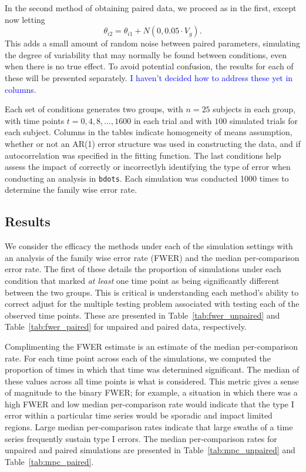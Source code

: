 \documentclass{article}
\newcommand{\xt}{\texttt}
\providecommand{\cn}[1]{\textcolor{blue}{#1}}
\begin{document}
In the second method of obtaining paired data, we proceed as in the first, except now letting
\begin{equation}
\theta_{i2} = \theta_{i1} + N(0, 0.05 \cdot  V_g).
\end{equation}
This adds a small amount of random noise between paired parameters, simulating the degree of variability that may normally be found between conditions, even when there is no true effect.  To avoid potential confusion, the results for each of these will be presented separately. \cn{I haven't decided how to address these yet in columns}.






Each set of conditions generates two groups, with $n = 25$ subjects in each group, with time points $t = 0, 4, 8, \dots, 1600$ in each trial and with $100$ simulated trials for each subject. Columns in the tables indicate homogeneity of means assumption, whether or not an AR(1) error structure was used in constructing the data, and if autocorrelation was specified in the fitting function. The last conditions help assess the impact of correctly or incorrectlyh identifying the type of error when conducting an analysis in \xt{bdots}. Each simulation was conducted 1000 times to determine the family wise error rate. 


\subsection{Results}

We consider the efficacy the methods under each of the simulation settings with an analysis of the family wise error rate (FWER) and the median per-comparison error rate. The first of these details the proportion of simulations under each condition that marked \textit{at least} one time point as being significantly different between the two groups. This is critical is understanding each method's ability to correct adjust for the multiple testing problem associated with testing each of the observed time points. These are presented in Table~\ref{tab:fwer_unpaired} and Table~\ref{tab:fwer_paired} for unpaired and paired data, respectively.

Complimenting the FWER estimate is an estimate of the median per-comparison rate. For each time point across each of the simulations, we computed the proportion of times in which that time was determined significant. The median of these values across all time points is what is considered. This metric gives a sense of magnitude to the binary FWER; for example, a situation in which there was a high FWER and low median per-comparison rate would indicate that the type I error within a particular time series would be sporadic and impact limited regions. Large median per-comparison rates indicate that large swaths of a time series frequently sustain type I errors. The median per-comparison rates for unpaired and paired simulations are presented in Table~\ref{tab:mpc_unpaired} and Table~\ref{tab:mpc_paired}.
\end{document}
